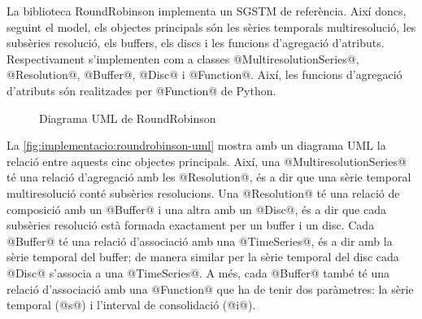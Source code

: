 La biblioteca RoundRobinson implementa un \gls{SGSTM} de referència. Així
doncs, seguint el model, els objectes principals són les sèries
temporals multiresolució, les subsèries resolució, els buffers, els
discs i les funcions d'agregació d'atributs. Respectivament
s'implementen com a classes @MultiresolutionSeries@,
@Resolution@, @Buffer@, @Disc@ i @Function@.
Així, les funcions d'agregació d'atributs són realitzades per
@Function@ de Python.


\begin{figure}[tp]
  \centering


  \caption{Diagrama UML de RoundRobinson}
  \label{fig:implementacio:roundrobinson-uml}
\end{figure}



La \autoref{fig:implementacio:roundrobinson-uml} mostra amb un
diagrama UML la relació entre aquests cinc objectes principals. Així,
una @MultiresolutionSeries@ té una relació d'agregació amb les
@Resolution@, és a dir que una sèrie temporal multiresolució
conté subsèries resolucions.  Una @Resolution@ té una relació de
composició amb un @Buffer@ i una altra amb un @Disc@, és a
dir que cada subsèries resolució està formada exactament per un buffer
i un disc. Cada @Buffer@ té una relació d'associació amb una
@TimeSeries@, és a dir amb la sèrie temporal del buffer; de
manera similar per la sèrie temporal del disc cada @Disc@
s'associa a una @TimeSeries@. A més, cada @Buffer@ també té
una relació d'associació amb una @Function@ que ha de tenir dos
paràmetres: la sèrie temporal (@s@) i l'interval de consolidació
(@i@).




